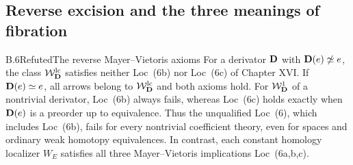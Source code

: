 \subsection{Reverse excision and the three meanings of fibration}

\begin{claim}{B.6}{Refuted}{The reverse Mayer--Vietoris axioms}
For a derivator $\mathbf D$ with $\mathbf D(e)\not\simeq e$, the class
$\mathcal W_{\mathbf D}^{\mathrm{lc}}$ satisfies neither Loc~(6b) nor Loc~(6c) of Chapter XVI.
If $\mathbf D(e)\simeq e$, all arrows belong to $\mathcal W_{\mathbf D}^{\mathrm{lc}}$ and both
axioms hold. For $\mathcal W_{\mathbf D}^{1}$ of a nontrivial derivator,
Loc~(6b) always fails, whereas Loc~(6c) holds exactly when
$\mathbf D(e)$ is a preorder up to equivalence.
Thus the unqualified Loc~(6), which includes
Loc~(6b), fails for every nontrivial coefficient theory, even
for spaces and ordinary weak homotopy equivalences. In contrast,
each constant homology localizer $W_E$ satisfies all three
Mayer--Vietoris implications Loc~(6a,b,c).
\end{claim}
